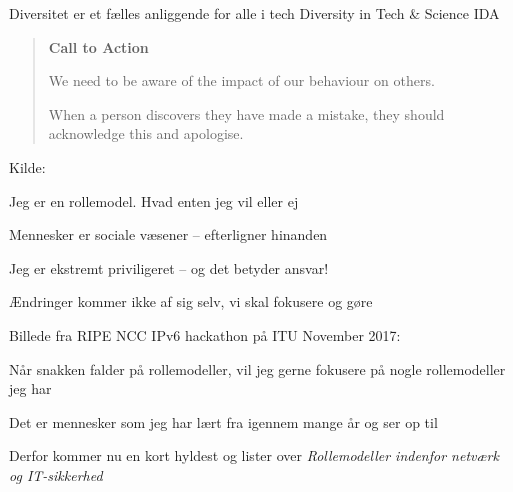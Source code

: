 \documentclass[Screen16to9,17pt]{foils}
\begin{document}
\mytitlepage
{Diversitet er et fælles anliggende for alle i tech}
{Diversity in Tech \& Science IDA}


\hlkprofil


\begin{quote}
{\bf \LARGE Call to Action}

We need to be aware of the impact of our behaviour on others.

When a person discovers they have made a mistake, they should acknowledge this and apologise.
\end{quote}
Kilde:

\begin{list1}
\item Jeg er en rollemodel. Hvad enten jeg vil eller ej
\item Mennesker er sociale væsener -- efterligner hinanden
\vskip 2cm

\item Jeg er ekstremt priviligeret -- og det betyder ansvar!

\item Ændringer kommer ikke af sig selv, vi skal fokusere og gøre
\end{list1}






{\color{red}\faHeart} Billede fra RIPE NCC IPv6 hackathon på ITU November 2017: {\color{red}\faHeart}\\{\footnotesize
{}}


\begin{list1}
\item Når snakken falder på rollemodeller, vil jeg gerne fokusere på nogle
rollemodeller jeg har

\item Det er mennesker som jeg har lært fra igennem mange år og ser op til

\item Derfor kommer nu en kort hyldest og lister over \emph{Rollemodeller indenfor netværk og IT-sikkerhed}
\end{list1}
\end{document}
